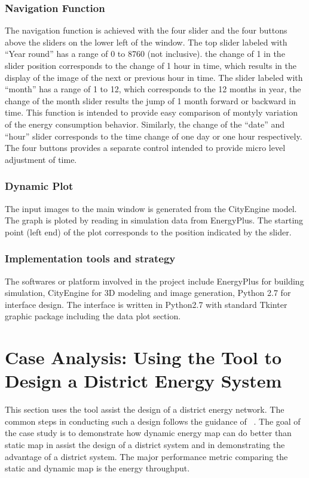 \documentclass[hidelinks,12pt]{article}
\begin{document}
\subsubsection {Navigation Function}
The navigation function is achieved with the four slider and the four
buttons above the sliders on the lower left of the window. The top
slider labeled with ``Year round'' has a range of 0 to 8760 (not
inclusive). the change of 1 in the slider position corresponds to the
change of 1 hour in time, which results in the display of the image of
the next or previous hour in time. The slider labeled with ``month''
has a range of 1 to 12, which corresponds to the 12 months in year,
the change of the month slider results the jump of 1 month forward or
backward in time. This function is intended to provide easy comparison
of montyly variation of the energy consumption behavior. Similarly,
the change of the ``date'' and ``hour'' slider corresponds to the time
change of one day or one hour respectively. The four buttons provides
a separate control intended to provide micro level adjustment of time.

\subsubsection {Dynamic Plot}
The input images to the main window is generated from the CityEngine
model. The graph is ploted by reading in simulation data from
EnergyPlus. The starting point (left end) of the plot corresponds to
the position indicated by the slider. 
\subsubsection {Implementation tools and strategy}
The softwares or platform involved in the project include EnergyPlus
for building simulation, CityEngine for 3D modeling and image
generation, Python 2.7 for interface design. The interface is written
in Python2.7 with standard Tkinter graphic package including the data
plot section.
\section{Case Analysis: Using the Tool to Design a District Energy System}
This section uses the tool assist the design of a district energy
network. The common steps in conducting such a design follows the
guidance of ~\cite{IDEA2012}. The goal of the case study is to
demonstrate how dynamic energy map can do better than static map in
assist the design of a district system and in demonstrating the
advantage of a district system. The major performance metric comparing
the static and dynamic map is the energy throughput.
\end{document}
